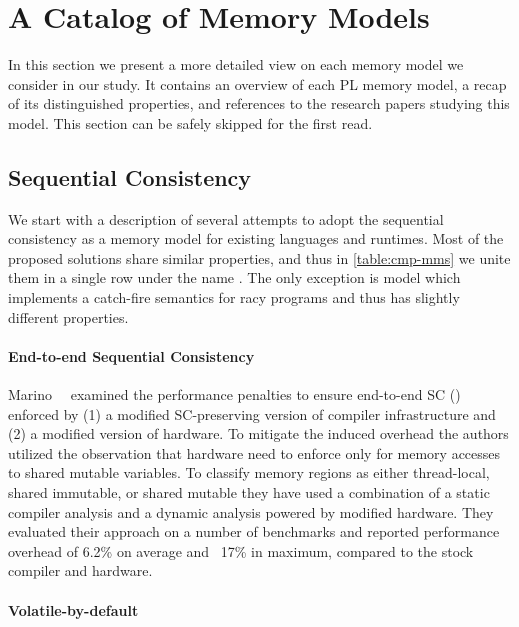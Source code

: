 \section{A Catalog of Memory Models}
\label{sec:catalog}

In this section we present a more detailed view 
on each memory model we consider in our study. 
It contains an overview of each PL memory model,
a recap of its distinguished properties,
and references to the research papers studying this model. 
This section can be safely skipped for the first read.





\subsection{Sequential Consistency}
\label{sec:catalog:sc}

We start with a description of several attempts 
to adopt the sequential consistency as a memory model 
for existing languages and runtimes. 
Most of the proposed solutions share similar properties, 
and thus in \cref{table:cmp-mms} we unite them 
in a single row under the name \SC. 
The only exception is \DRFx model which implements
a catch-fire semantics for racy programs 
and thus has slightly different properties. 

\paragraph{End-to-end Sequential Consistency}

Marino~\etal~\cite{Marino-al:PLDI11, Singh-al:ISCA12} 
examined the performance penalties to ensure end-to-end SC (\EtESC)
enforced by (1) a modified SC-preserving version 
of \LLVM compiler infrastructure and 
(2) a modified version of \Intel hardware. 
To mitigate the induced overhead the authors 
utilized the observation that hardware need to 
enforce \SC only for memory accesses to shared mutable variables. 
To classify memory regions as either thread-local,
shared immutable, or shared mutable they have used 
a combination of a static compiler analysis and 
a dynamic analysis powered by modified hardware. 
They evaluated their approach on a number of benchmarks
and reported performance overhead of 6.2\% on average 
and ~17\% in maximum, compared to the stock \LLVM compiler 
and \Intel hardware. 

\paragraph{Volatile-by-default}


